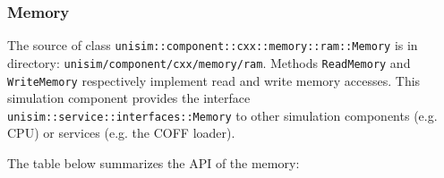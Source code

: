 \newpage
\subsubsection{Memory}
\label{tms320c3x_memory}

The source of class \texttt{unisim::component::cxx::memory::ram::Memory} is in directory: \newline
\texttt{unisim/component/cxx/memory/ram}.\newline
Methods \texttt{ReadMemory} and \texttt{WriteMemory} respectively implement read and write memory accesses.
This simulation component provides the interface \texttt{unisim::service::interfaces::Memory} to other simulation components (e.g. CPU) or services (e.g. the COFF loader).

\noindent The table below summarizes the API of the memory:

